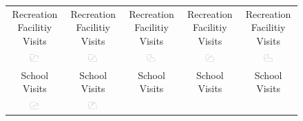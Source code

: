 \documentclass[9pt,twoside,lineno]{pnas-new}
\theoremstyle{definition}
\begin{document}
\begin{figure}[!ht]
{\begin{minipage}{\linewidth}
\begin{tabular}{c|c|c|c|c}
   Recreation Facilitiy Visits  &  Recreation Facilitiy Visits  & Recreation Facilitiy Visits  &  Recreation Facilitiy Visits& Recreation Facilitiy Visits     \\  
      \includegraphics[width=0.20\textwidth]{tables_and_figures/gymArizonaPima}&
      \includegraphics[width=0.20\textwidth]{tables_and_figures/gymMichiganIngham}&
      \includegraphics[width=0.20\textwidth]{tables_and_figures/gymPennsylvaniaCentre}&
      \includegraphics[width=0.20\textwidth]{tables_and_figures/gymIowaStory}& 
      \includegraphics[width=0.20\textwidth]{tables_and_figures/gymIllinoisChampaign}\\   
   School Visits  &  School Visits &School Visits  &  School Visits &School Visits   \\  
      \includegraphics[width=0.20\textwidth]{tables_and_figures/schoolArizonaPima}&
      \includegraphics[width=0.20\textwidth]{tables_and_figures/schoolMichiganIngham}&

\end{tabular}
\end{minipage}}
\end{figure}
\end{document}
